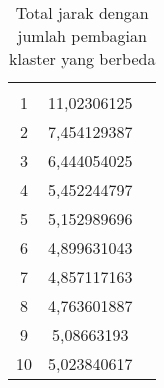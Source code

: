 \begin{table}[H]
\centering
\begin{tabular}{ccl}
\cellcolor[HTML]{4472C4}{\color[HTML]{FFFFFF} \textbf{Banyak Klaster}} & \cellcolor[HTML]{4472C4}{\color[HTML]{FFFFFF} \textbf{Total Jarak}} &  \\
\cellcolor[HTML]{D9E1F2}1 & \cellcolor[HTML]{D9E1F2}11,02306125 &  \\
2                         & 7,454129387                         &  \\
\cellcolor[HTML]{D9E1F2}3 & \cellcolor[HTML]{D9E1F2}6,444054025 &  \\
4                         & 5,452244797                         &  \\
\cellcolor[HTML]{D9E1F2}5 & \cellcolor[HTML]{D9E1F2}5,152989696 &  \\
6                         & 4,899631043                         &  \\
\cellcolor[HTML]{D9E1F2}7 & \cellcolor[HTML]{D9E1F2}4,857117163 &  \\
8                         & 4,763601887                         &  \\
\cellcolor[HTML]{D9E1F2}9 & \cellcolor[HTML]{D9E1F2}5,08663193  &  \\
10                        & 5,023840617                         & 
\end{tabular}
\caption{Total jarak dengan jumlah pembagian klaster yang berbeda}
\label{tab:totaljarak}
\end{table}